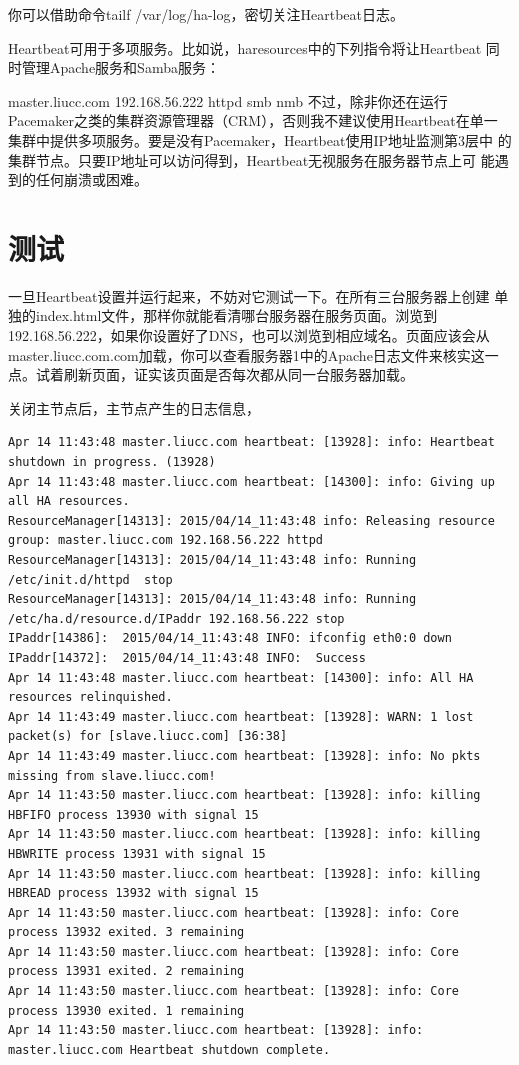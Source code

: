 你可以借助命令tailf /var/log/ha-log，密切关注Heartbeat日志。

Heartbeat可用于多项服务。比如说，haresources中的下列指令将让Heartbeat
同时管理Apache服务和Samba服务：

master.liucc.com 192.168.56.222 httpd smb nmb 不过，除非你还在运行
Pacemaker之类的集群资源管理器（CRM），否则我不建议使用Heartbeat在单一
集群中提供多项服务。要是没有Pacemaker，Heartbeat使用IP地址监测第3层中
的集群节点。只要IP地址可以访问得到，Heartbeat无视服务在服务器节点上可
能遇到的任何崩溃或困难。

\section{测试}

一旦Heartbeat设置并运行起来，不妨对它测试一下。在所有三台服务器上创建
单独的index.html文件，那样你就能看清哪台服务器在服务页面。浏览到
192.168.56.222，如果你设置好了DNS，也可以浏览到相应域名。页面应该会从
master.liucc.com.com加载，你可以查看服务器1中的Apache日志文件来核实这一
点。试着刷新页面，证实该页面是否每次都从同一台服务器加载。

关闭主节点后，主节点产生的日志信息，

\begin{verbatim}
Apr 14 11:43:48 master.liucc.com heartbeat: [13928]: info: Heartbeat shutdown in progress. (13928)
Apr 14 11:43:48 master.liucc.com heartbeat: [14300]: info: Giving up all HA resources.
ResourceManager[14313]:	2015/04/14_11:43:48 info: Releasing resource group: master.liucc.com 192.168.56.222 httpd
ResourceManager[14313]:	2015/04/14_11:43:48 info: Running /etc/init.d/httpd  stop
ResourceManager[14313]:	2015/04/14_11:43:48 info: Running /etc/ha.d/resource.d/IPaddr 192.168.56.222 stop
IPaddr[14386]:	2015/04/14_11:43:48 INFO: ifconfig eth0:0 down
IPaddr[14372]:	2015/04/14_11:43:48 INFO:  Success
Apr 14 11:43:48 master.liucc.com heartbeat: [14300]: info: All HA resources relinquished.
Apr 14 11:43:49 master.liucc.com heartbeat: [13928]: WARN: 1 lost packet(s) for [slave.liucc.com] [36:38]
Apr 14 11:43:49 master.liucc.com heartbeat: [13928]: info: No pkts missing from slave.liucc.com!
Apr 14 11:43:50 master.liucc.com heartbeat: [13928]: info: killing HBFIFO process 13930 with signal 15
Apr 14 11:43:50 master.liucc.com heartbeat: [13928]: info: killing HBWRITE process 13931 with signal 15
Apr 14 11:43:50 master.liucc.com heartbeat: [13928]: info: killing HBREAD process 13932 with signal 15
Apr 14 11:43:50 master.liucc.com heartbeat: [13928]: info: Core process 13932 exited. 3 remaining
Apr 14 11:43:50 master.liucc.com heartbeat: [13928]: info: Core process 13931 exited. 2 remaining
Apr 14 11:43:50 master.liucc.com heartbeat: [13928]: info: Core process 13930 exited. 1 remaining
Apr 14 11:43:50 master.liucc.com heartbeat: [13928]: info: master.liucc.com Heartbeat shutdown complete.
\end{verbatim}

